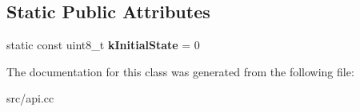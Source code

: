 \subsection*{Static Public Attributes}
\begin{DoxyCompactItemize}
\item 
\hypertarget{classv8_1_1_utf8_length_helper_a20624c47006b9117c0c7079f8a7f6f85}{}static const uint8\+\_\+t {\bfseries k\+Initial\+State} = 0\label{classv8_1_1_utf8_length_helper_a20624c47006b9117c0c7079f8a7f6f85}

\end{DoxyCompactItemize}


The documentation for this class was generated from the following file\+:\begin{DoxyCompactItemize}
\item 
src/api.\+cc\end{DoxyCompactItemize}
